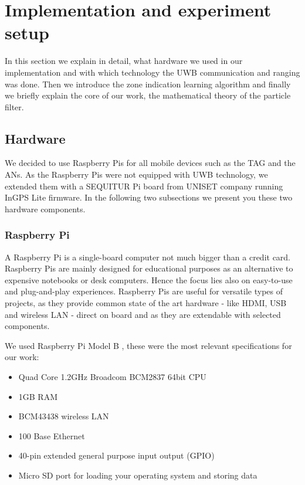 
\chapter{Implementation and experiment setup} %

\label{Chapter4} %
In this section we explain in detail, what hardware we used in our implementation and with which technology the UWB communication and ranging was done. Then we introduce the zone indication learning algorithm and finally we briefly explain the core of our work, the mathematical theory of the particle filter.


\section{Hardware}
We decided to use Raspberry Pis for all mobile devices such as the TAG and the ANs. As the Raspberry Pis were not equipped with UWB technology, we extended them with a SEQUITUR Pi board from UNISET company running InGPS Lite firmware. In the following two subsections we present you these two hardware components.


\subsection{Raspberry Pi}
A Raspberry Pi is a single-board computer not much bigger than a credit card. Raspberry Pis are mainly designed for educational purposes as an alternative to expensive notebooks or desk computers. Hence the focus lies also on easy-to-use and plug-and-play experiences. Raspberry Pis are useful for versatile types of projects, as they provide common state of the art hardware - like HDMI, USB and wireless LAN - direct on board and as they are extendable with selected components.

We used Raspberry Pi Model B \cite{Raspberry}, these were the most relevant specifications for our work:
\begin{itemize}
\item Quad Core 1.2GHz Broadcom BCM2837 64bit CPU
\item 1GB RAM
\item BCM43438 wireless LAN
\item 100 Base Ethernet
\item 40-pin extended general purpose input output (GPIO)
\item Micro SD port for loading your operating system and storing data
\end{itemize}

